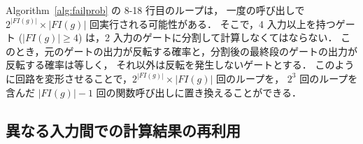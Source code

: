 Algorithm~\ref{alg:failprob} の 8-18 行目のループは，
一度の呼び出しで $2^{|FI(g)|} \times |FI(g)|$ 回実行される可能性がある．
そこで，4 入力以上を持つゲート ($|FI(g)| \geq 4$) は，2 入力のゲートに分割して計算しなくてはならない．
このとき，元のゲートの出力が反転する確率と，分割後の最終段のゲートの出力が反転する確率は等しく，
それ以外は反転を発生しないゲートとする．
このように回路を変形させることで，$2^{|FI(g)|} \times |FI(g)|$ 回のループを，
$2^3$ 回のループを含んだ $|FI(g)| - 1$ 回の関数呼び出しに置き換えることができる．

\subsection{異なる入力間での計算結果の再利用}\label{sec:prop:deform:reuse}

